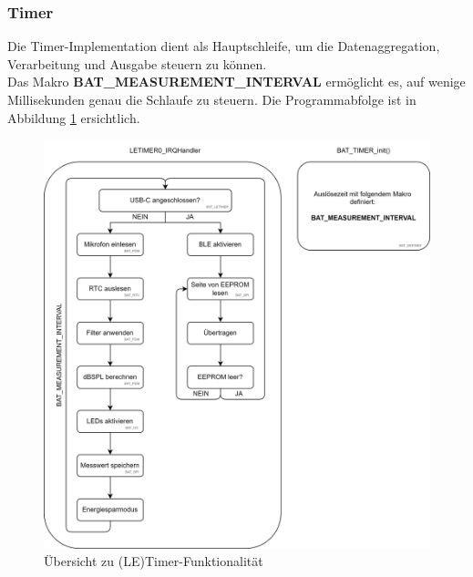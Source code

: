 \documentclass[12pt]{article}
\begin{document}
	\subsubsection*{Timer}
	Die Timer-Implementation dient als Hauptschleife, um die Datenaggregation, Verarbeitung und Ausgabe steuern zu können. \\Das Makro \textbf{BAT\_MEASUREMENT\_INTERVAL} ermöglicht es, auf wenige Millisekunden genau die Schlaufe zu steuern. Die Programmabfolge ist in Abbildung \ref{fig:batsoftwareletimer} ersichtlich.
	\begin{figure}[H]
		\centering
		\includegraphics[width=1\linewidth]{images/BAT_Software_LETIMER}
		\caption{Übersicht zu (LE)Timer-Funktionalität}
		\label{fig:batsoftwareletimer}
	\end{figure}
\end{document}

